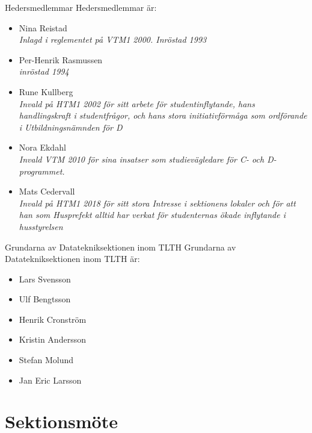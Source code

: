 \documentclass[pdfbookmarks,a4paper,11pt]{article}
\newlength{\itemcollength}
\newenvironment{reglemlista}{%
  \begin{list}{}{%
      \setlength{\labelwidth}{\itemcollength}%
      \setlength{\leftmargin}{\labelwidth + \labelsep}%
      \renewcommand{\makelabel}[1]{%
        \raisebox{0pt}[1ex][0pt]{%
          \makebox[\labelwidth][l]{%
            \parbox[t]{\itemcollength}{%
              \raggedright\hspace{0pt}##1}}}\hfill}%
      }}{%
  \end{list}}
\begin{document}
\begin{reglemlista}

	\item[Hedersmedlemmar]
	Hedersmedlemmar är:
	\begin{itemize}
		\item Nina Reistad\\
		      \emph{Inlagd i reglementet på VTM1 2000. Inröstad 1993}
		\item Per-Henrik Rasmussen \\ \emph{inröstad 1994}
		\item Rune Kullberg\\
		      \emph{Invald på HTM1 2002 för sitt arbete för studentinflytande, hans handlingskraft i studentfrågor, och hans stora initiativförmåga som ordförande i Utbildningsnämnden för D}
		\item Nora Ekdahl\\
		      \emph{Invald VTM 2010 för sina insatser som studievägledare för C- och D-programmet.}
		\item Mats Cedervall \\
		      \emph{Invald på HTM1 2018 för sitt stora Intresse i sektionens lokaler och för att han som Husprefekt alltid har verkat för studenternas ökade inflytande i husstyrelsen}
	\end{itemize}

	\item[Grundarna av Datatekniksektionen inom TLTH]
	Grundarna av Datatekniksektionen inom TLTH är:

	\begin{itemize}
		\item Lars Svensson
		\item Ulf Bengtsson
		\item Henrik Cronström
		\item Kristin Andersson
		\item Stefan Molund
		\item Jan Eric Larsson
	\end{itemize}

\end{reglemlista}

\section{Sektionsmöte}
\end{document}
